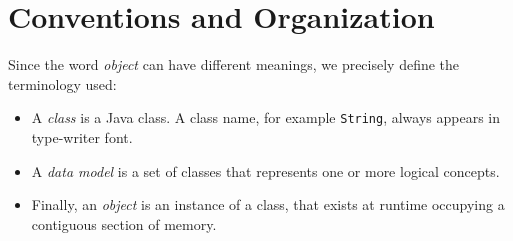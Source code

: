 \section{Conventions and Organization}


Since the word \textit{object} can have different meanings, we precisely define the terminology used:
\begin{itemize}
\item A \textit{class} is a Java class. A class name, for example \texttt{String}, always appears in type-writer font. 
\item A \textit{data model} is a set of classes that represents one or more logical concepts.
\item Finally, an \textit{object} is an instance of a class, that exists at runtime occupying a contiguous section of memory.
\end{itemize} 

 

